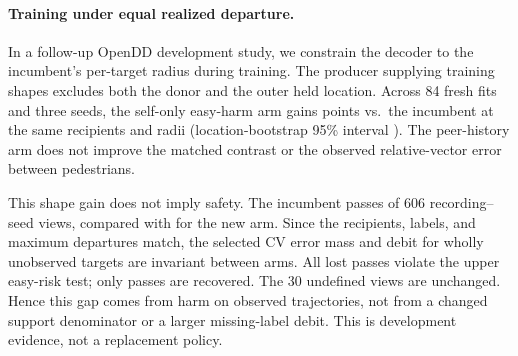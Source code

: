 \paragraph{Training under equal realized departure.}
In a follow-up OpenDD development study, we constrain the decoder to
the incumbent's per-target radius during training. The producer supplying
training shapes excludes both the donor and the outer held location.
Across 84 fresh fits and three seeds, the self-only easy-harm arm gains
\RadiusGain{} points vs.\ the incumbent at the same recipients and radii
(location-bootstrap 95\% interval \RadiusInterval{}).
The peer-history arm does not improve the matched contrast or the
observed relative-vector error between pedestrians.

This shape gain does not imply safety. The incumbent passes
\RadiusOldPass{} of 606 recording--seed views, compared with
\RadiusNewPass{} for the new arm. Since the recipients, labels, and
maximum departures match, the selected CV error mass and debit for
wholly unobserved targets are invariant between arms. All
\RadiusLost{} lost passes violate the upper easy-risk test; only
\RadiusGained{} passes are recovered. The 30 undefined views are unchanged.
Hence this gap comes from harm on observed trajectories, not from
a changed support denominator or a larger missing-label debit.
This is development evidence, not a replacement policy.
